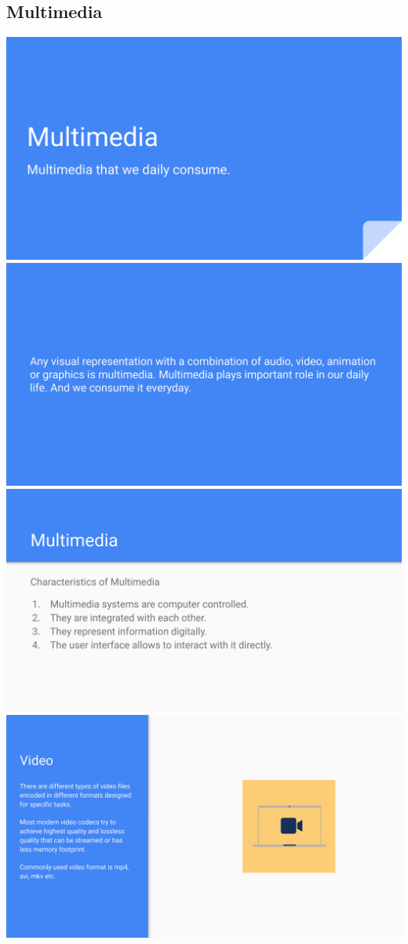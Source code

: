 \documentclass[17pt,a4paper,oneside,margin=1in]{article}
\begin{document}
\subsection{Multimedia}
\begin{center}
	\includegraphics[width=0.7\linewidth]{./scrot/multimedia-0.png}
	\includegraphics[width=0.7\linewidth]{./scrot/multimedia-1.png}
	\includegraphics[width=0.7\linewidth]{./scrot/multimedia-2.png}
	\includegraphics[width=0.7\linewidth]{./scrot/multimedia-3.png}
\end{center}
\end{document}
